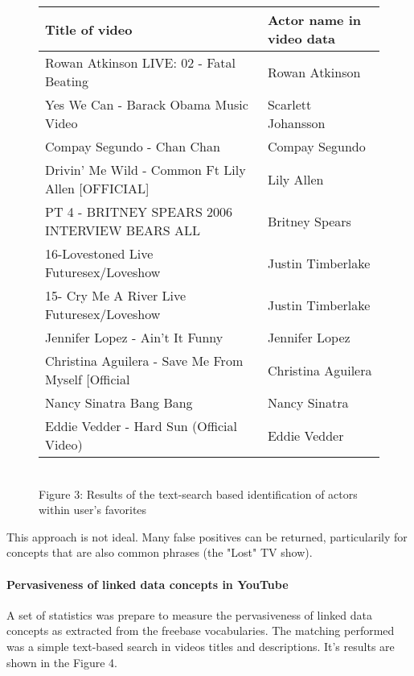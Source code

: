 \begin{figure}[h!]
  \begin{center}
    \begin{tabular}{ | p{7cm} | p{4cm} | } \hline
      Title of video & Actor name in video data \\ \hline
      Rowan Atkinson LIVE: 02 - Fatal Beating & Rowan Atkinson \\ \hline
      Yes We Can - Barack Obama Music Video & Scarlett Johansson \\ \hline
      Compay Segundo - Chan Chan & Compay Segundo \\ \hline
      Drivin' Me Wild - Common Ft Lily Allen [OFFICIAL] & Lily Allen \\ \hline
      PT 4 - BRITNEY SPEARS 2006 INTERVIEW BEARS ALL & Britney Spears \\ \hline
      16-Lovestoned Live Futuresex/Loveshow & Justin Timberlake \\ \hline
      15- Cry Me A River Live Futuresex/Loveshow & Justin Timberlake \\ \hline
      Jennifer Lopez - Ain't It Funny & Jennifer Lopez \\ \hline
      Christina Aguilera - Save Me From Myself [Official & Christina Aguilera \\ \hline
      Nancy Sinatra Bang Bang & Nancy Sinatra \\ \hline
      Eddie Vedder - Hard Sun (Official Video) & Eddie Vedder \\ \hline
    \end{tabular} \\
    Figure 3: Results of the text-search based identification of actors within user's favorites \\
  \end{center}
\end{figure}

This approach is not ideal. Many false positives can be returned, particularily
for concepts that are also common phrases (\eg the "Lost" TV show).

\paragraph{Pervasiveness of linked data concepts in YouTube}
A set of statistics was prepare to measure the pervasiveness of linked data
concepts as extracted from the freebase vocabularies. The matching performed
was a simple text-based search in videos titles and descriptions. It's results
are shown in the Figure 4.

